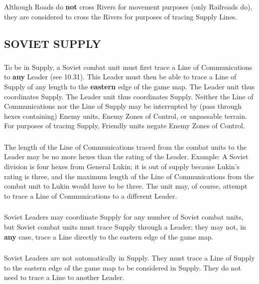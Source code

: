 \subsubsection{} Although Roads do \textbf{not} cross Rivers for movement purposes (only Railroads do), they are considered to cross the Rivers for purposes of tracing Supply Lines.

\subsection{SOVIET SUPPLY}

\subsubsection{} To be in Supply, a Soviet combat unit must first trace a Line of Communications to \textbf{any} Leader (see 10.31). This Leader must then be able to trace a Line of Supply of any length to the \textbf{eastern} edge of the game map. The Leader unit thus coordinates Supply. The Leader unit thus coordinates Supply. Neither the Line of Communications nor the Line of Supply may be interrupted by (pass through hexes containing) Enemy units, Enemy Zones of Control, or unpassable terrain. For purposes of tracing Supply, Friendly units negate Enemy Zones of Control.

\subsubsection{} The length of the Line of Communications traced from the combat units to the Leader may be no more hexes than the rating of the Leader. Example: A Soviet division is four hexes from General Lukin; it is out of supply because Lukin's rating is three, and the maximum length of the Line of Communications from the combat unit to Lukin would have to be three. The unit may, of course, attempt to trace a Line of Communications to a different Leader.

\subsubsection{} Soviet Leaders may coordinate Supply for any number of Soviet combat units, but Soviet combat units must trace Supply through a Leader; they may not, in \textbf{any} case, trace a Line directly to the eastern edge of the game map.

\subsubsection{} Soviet Leaders are not automatically in Supply. They must trace a Line of Supply to the eastern edge of the game map to be considered in Supply. They do not need to trace a Line to another Leader.


